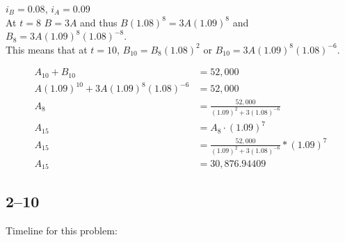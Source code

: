 \documentclass[a4paper, 12pt, reqno]{amsart}
\numberwithin{equation}{section}
\begin{document}
$i_B=0.08$, $i_A=0.09$\\
At $t=8$ $B=3A$ and thus $B(1.08)^8=3A(1.09)^8$ and 
$B_8 = 3A(1.09)^8(1.08)^{-8}$. \\
This means that at $t=10$, $B_{10} = B_8(1.08)^2$ or 
$B_{10} = 3A(1.09)^8(1.08)^{-6}$.

\begin{equation}\nonumber
    \begin{aligned}
        A_{10} + B_{10} &= 52,000  \\
        A(1.09)^{10} + 3A(1.09)^8(1.08)^{-6} &= 52,000 \\
        A_8 &= \frac{52,000}{(1.09)^{2} + 3(1.08)^{-6}} \\
        A_{15} &= A_8 \cdot (1.09)^7                        \\
        A_{15} &= \frac{52,000}{(1.09)^{2} + 3(1.08)^{-6}} * (1.09)^7   \\
        A_{15} &= 30,876.94409
    \end{aligned}
\end{equation}

\subsection*{2--10}

Timeline for this problem:\\
\end{document}
